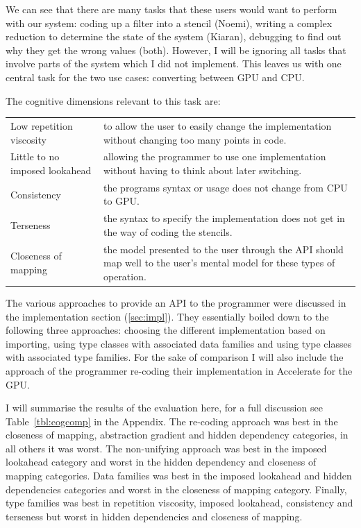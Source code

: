 \documentclass[12pt,a4paper,twoside]{scrbook}
\begin{document}
We can see that there are many tasks that these users would want to
perform with our system: coding up a filter into a stencil (Noemi),
writing a complex reduction to determine the state of the system
(Kiaran), debugging to find out why they get the wrong values (both).
However, I will be ignoring all tasks that involve parts of the system
which I did not implement. This leaves us with one central task for the
two use cases: converting between GPU and CPU.

The cognitive dimensions relevant to this task are:

\begin{tabular}{p{} p{}}
  Low repetition viscosity & to allow the user to easily change the
  implementation without changing too many points in code.
  \\
  Little to no imposed lookahead & allowing the programmer to use one
  implementation without having to think about later switching.
  \\
  Consistency & the programs syntax or usage does not change from CPU to
  GPU.
  \\
  Terseness & the syntax to specify the implementation does not get in the
  way of coding the stencils.
  \\
  Closeness of mapping & the model presented to the user through the API should
  map well to the user's mental model for these types of
  operation.
  \\
\end{tabular}

The various approaches to provide an API to the programmer were discussed in the
implementation section (\ref{sec:impl}). They essentially boiled down to the
following three approaches: choosing the different implementation based on
importing, using type classes with associated data families and using type
classes with associated type families. For the sake of comparison I will also
include the approach of the programmer re-coding their implementation in
Accelerate for the GPU.

I will summarise the results of the evaluation here, for a full discussion see
Table~\ref{tbl:cogcomp} in the Appendix. The re-coding approach was best in the
closeness of mapping, abstraction gradient and hidden dependency categories, in
all others it was worst. The non-unifying approach was best in the imposed
lookahead category and worst in the hidden dependency and closeness of mapping
categories. Data families was best in the imposed lookahead and hidden
dependencies categories and worst in the closeness of mapping category. Finally,
type families was best in repetition viscosity, imposed lookahead, consistency
and terseness but worst in hidden dependencies and closeness of mapping.
\end{document}
